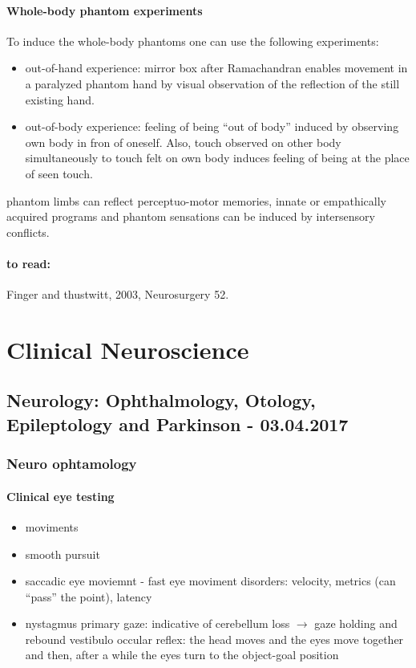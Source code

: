 \documentclass[12pt,article,oneside,a4paper]{memoir}
\begin{document}
\paragraph{Whole-body phantom experiments}
To induce the whole-body phantoms one can use the following experiments:
\begin{itemize}
\item out-of-hand experience: mirror box after Ramachandran enables movement in a paralyzed phantom hand by visual observation of the reflection of the still existing hand.
\item out-of-body experience: feeling of being ``out of body'' induced by observing own body in fron of oneself. Also, touch observed on other body simultaneously to touch felt on own body induces feeling of being at the place of seen touch.
\end{itemize}

phantom limbs can reflect perceptuo-motor memories, innate or empathically acquired programs and phantom sensations can be induced by intersensory conflicts.

\paragraph{to read:} Finger and thustwitt, 2003, Neurosurgery 52.

\newpage
\section{Clinical Neuroscience}

\subsection{Neurology: Ophthalmology, Otology, Epileptology and Parkinson - 03.04.2017}
\subsubsection{Neuro ophtamology}
\paragraph{Clinical eye testing}  
\begin{itemize}
\item moviments
\item smooth pursuit
\item saccadic eye moviemnt - fast eye moviment
\subitem disorders: velocity, metrics (can ``pass'' the point), latency
\item nystagmus
\subitem primary gaze: indicative of cerebellum loss $\rightarrow$ gaze holding and rebound
\subitem vestibulo occular reflex: the head moves and the eyes move together and then, after a while the eyes turn to the object-goal position
\end{itemize}
\end{document}
